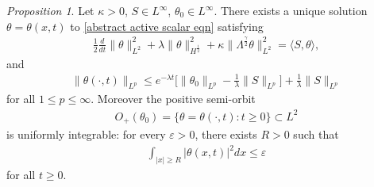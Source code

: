 \documentclass[reqno]{amsart}%
\theoremstyle{definition}
\theoremstyle{remark}
\numberwithin{equation}{section}
\newtheorem{proposition}[theorem]{Proposition}
\newcommand{\1}{\mathbf{1}}
\numberwithin{equation}{section}
\numberwithin{theorem}{section}
\numberwithin{figure}{section}
\begin{document}
\begin{proposition}\label{uniform bound on theta kappa>0 prop}
Let $\kappa>0$, $S\in L^\infty$, $\theta_0\in L^\infty$. There exists a unique solution $\theta=\theta(x,t)$ to \eqref{abstract active scalar eqn} satisfying
\begin{align}\label{energy equality with damping}
\frac{1}{2}\frac{d}{dt}\|\theta\|_{L^2}^2+\lambda\|\theta\|_{H^\frac{1}{2}}^2+\kappa\|\Lambda^\frac{\gamma}{2}\theta\|^2_{L^2}=\langle S,\theta\rangle,
\end{align}
and
\begin{align}\label{bound on theta by damping}
\|\theta(\cdot,t)\|_{L^p}\le e^{-\lambda t}\Big[\|\theta_0\|_{L^p}-\frac{1}{\lambda}\|S\|_{L^p}\Big]+\frac{1}{\lambda}\|S\|_{L^p}
\end{align}
for all $1\le p\le \infty$. Moreover the positive semi-orbit
\begin{align}\label{def of positive semi-orbit}
O_{+}(\theta_0)=\{\theta=\theta(\cdot,t): t\ge0\}\subset L^2
\end{align}
is uniformly integrable: for every $\varepsilon>0$, there exists $R>0$ such that
\begin{align}\label{uniform integrable}
\int_{|x|\ge R}|\theta(x,t)|^2dx\le \varepsilon
\end{align}
for all $t\ge0$.
\end{proposition}
\end{document}
